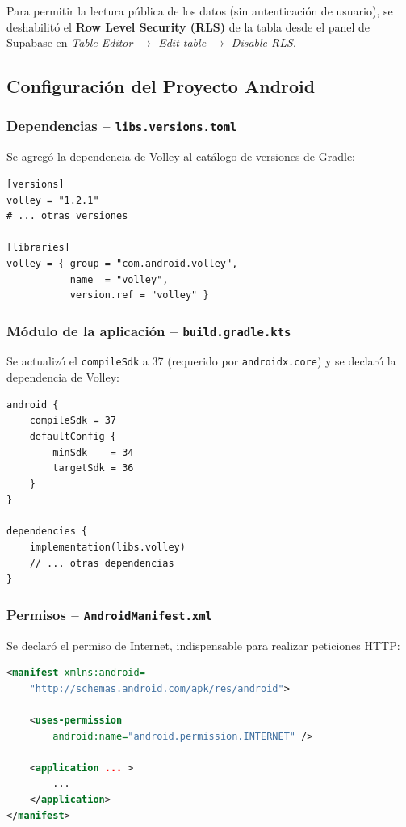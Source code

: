 \documentclass[12pt]{article}
\begin{document}
Para permitir la lectura pública de los datos (sin autenticación de usuario), se deshabilitó el \textbf{Row Level Security (RLS)} de la tabla desde el panel de Supabase en \textit{Table Editor $\rightarrow$ Edit table $\rightarrow$ Disable RLS}.

\subsection{Configuración del Proyecto Android}

\subsubsection{Dependencias -- \texttt{libs.versions.toml}}

Se agregó la dependencia de Volley al catálogo de versiones de Gradle:

\begin{lstlisting}[language={}, caption={gradle/libs.versions.toml}]
[versions]
volley = "1.2.1"
# ... otras versiones

[libraries]
volley = { group = "com.android.volley",
           name  = "volley",
           version.ref = "volley" }
\end{lstlisting}

\subsubsection{Módulo de la aplicación -- \texttt{build.gradle.kts}}

Se actualizó el \texttt{compileSdk} a 37 (requerido por \texttt{androidx.core}) y se declaró la dependencia de Volley:

\begin{lstlisting}[language={}, caption={app/build.gradle.kts (fragmento)}]
android {
    compileSdk = 37
    defaultConfig {
        minSdk    = 34
        targetSdk = 36
    }
}

dependencies {
    implementation(libs.volley)
    // ... otras dependencias
}
\end{lstlisting}

\subsubsection{Permisos -- \texttt{AndroidManifest.xml}}

Se declaró el permiso de Internet, indispensable para realizar peticiones HTTP:

\begin{lstlisting}[language=XML, caption={AndroidManifest.xml -- permiso de Internet}]
<manifest xmlns:android=
    "http://schemas.android.com/apk/res/android">

    <uses-permission
        android:name="android.permission.INTERNET" />

    <application ... >
        ...
    </application>
</manifest>
\end{lstlisting}
\end{document}
